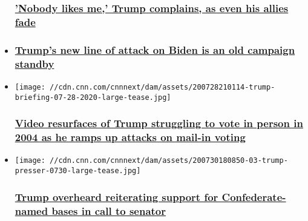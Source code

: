 \begin{itemize}
{  \subsubsection{\texorpdfstring{\href{/2020/08/01/politics/donald-trump-allies-election/index.html}{'Nobody
  likes me,' Trump complains, as even his allies
  fade}}{'Nobody likes me,' Trump complains, as even his allies fade}}\label{nobody-likes-me-trump-complains-as-even-his-allies-fade}}
\item
  \hypertarget{trumps-new-line-of-attack-on-biden-is-an-old-campaign-standby}{%
  \subsubsection{\texorpdfstring{\href{/2020/08/04/politics/trump-reset-biden-ads-sanders-aoc/index.html}{Trump's
  new line of attack on Biden is an old campaign
  standby}}{Trump's new line of attack on Biden is an old campaign standby}}\label{trumps-new-line-of-attack-on-biden-is-an-old-campaign-standby}}
\end{itemize}

\begin{itemize}
\item
  \href{/2020/07/31/politics/trump-vote-by-mail-provisional-ballot-2004-video/index.html}{}

  \texttt{[image: //cdn.cnn.com/cnnnext/dam/assets/200728210114-trump-briefing-07-28-2020-large-tease.jpg]}

  \hypertarget{video-resurfaces-of-trump-struggling-to-vote-in-person-in-2004-as-he-ramps-up-attacks-on-mail-in-voting}{%
  \subsubsection{\texorpdfstring{\href{/2020/07/31/politics/trump-vote-by-mail-provisional-ballot-2004-video/index.html}{Video
  resurfaces of Trump struggling to vote in person in 2004 as he ramps
  up attacks on mail-in
  voting}}{Video resurfaces of Trump struggling to vote in person in 2004 as he ramps up attacks on mail-in voting}}\label{video-resurfaces-of-trump-struggling-to-vote-in-person-in-2004-as-he-ramps-up-attacks-on-mail-in-voting}}
\item
  \href{/2020/07/31/politics/trump-confederate-bases-inhofe-call/index.html}{}

  \texttt{[image: //cdn.cnn.com/cnnnext/dam/assets/200730180850-03-trump-presser-0730-large-tease.jpg]}

  \hypertarget{trump-overheard-reiterating-support-for-confederate-named-bases-in-call-to-senator}{%
  \subsubsection{\texorpdfstring{\href{/2020/07/31/politics/trump-confederate-bases-inhofe-call/index.html}{Trump
  overheard reiterating support for Confederate-named bases in call to
  senator}}{Trump overheard reiterating support for Confederate-named bases in call to senator}}\label{trump-overheard-reiterating-support-for-confederate-named-bases-in-call-to-senator}}
\end{itemize}

